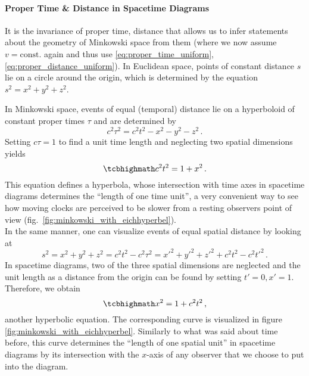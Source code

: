 \documentclass[../relativity_main.tex]{subfiles}
\begin{document}
			\paragraph{Proper Time \& Distance in Spacetime Diagrams}
It is the invariance of proper time, distance that allows us to infer statements about the geometry of Minkowski space from them (where we now assume $v = \text{const.}$ again and thus use \eqref{eq:proper_time_uniform}, \eqref{eq:proper_distance_uniform}). In Euclidean space, points of constant distance $s$ lie on a circle around the origin, which is determined by the equation $s^2 = x^2 + y^2 + z^2$.

In Minkowski space, events of equal (temporal) distance lie on a hyperboloid of constant proper times $\tau$ and are determined by
\begin{equation*}
	c^2 \tau^2 = c^2 t^2 - x^2 - y^2 - z^2 \, .
\end{equation*}
Setting $c \tau = 1$ to find a unit time length and neglecting two spatial dimensions yields
\begin{equation}
	\eqbox{
	c^2 t^2 = 1 + x^2
	} \, .
\end{equation}
This equation defines a hyperbola, whose intersection with time axes in spacetime diagrams determines the \enquote{length of one time unit}, a very convenient way to see how moving clocks are perceived to be slower from a resting observers point of view (fig.~\ref{fig:minkowski_with_eichhyperbel}).\\


In the same manner, one can visualize events of equal spatial distance by looking at
\begin{equation*}
	s^2 = x^2 + y^2 + z^2 = c^2 t^2 - c^2 \tau^2 = x'^2 + y'^2 + z'^2 + c^2 t^2 - c^2 t'^2
	\, .
\end{equation*}
In spacetime diagrams, two of the three spatial dimensions are neglected and the unit length as a distance from the origin can be found by setting $t' = 0, x' = 1$. Therefore, we obtain
\begin{equation}
	\eqbox{
	x^2 = 1 + c^2 t^2
	} \, ,
\end{equation}
another hyperbolic equation. The corresponding curve is visualized in figure \ref{fig:minkowski_with_eichhyperbel}. Similarly to what was said about time before, this curve determines the \enquote{length of one spatial unit} in spacetime diagrams by its intersection with the $x$-axis of any observer that we choose to put into the diagram.
\end{document}
